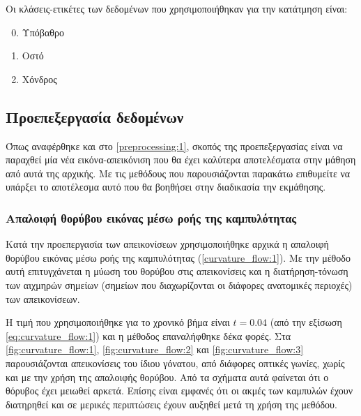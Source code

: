 \documentclass[a4paper,12pt]{article}
\begin{document}
Οι κλάσεις-ετικέτες των δεδομένων που χρησιμοποιήθηκαν για την κατάτμηση είναι:

\begin{enumerate}
    \setcounter{enumi}{-1} 
    \item Υπόβαθρο
    \item Οστό
    \item Χόνδρος
\end{enumerate}

\subsection{Προεπεξεργασία δεδομένων}

Όπως αναφέρθηκε και στο \ref{preprocessing:1}, σκοπός της προεπεξεργασίας είναι
να παραχθεί μία νέα εικόνα-απεικόνιση που θα έχει καλύτερα αποτελέσματα στην
μάθηση από αυτά της αρχικής. Με τις μεθόδους που παρουσιάζονται παρακάτω
επιθυμείτε να υπάρξει το αποτέλεσμα αυτό που θα βοηθήσει στην διαδικασία την
εκμάθησης.

\subsubsection{Απαλοιφή θορύβου εικόνας μέσω ροής της καμπυλότητας}

Κατά την προεπεργασία των απεικονίσεων χρησιμοποιήθηκε αρχικά η απαλοιφή θορύβου
εικόνας μέσω ροής της καμπυλότητας (\ref{curvature_flow:1}). Με την μέθοδο αυτή
επιτυγχάνεται η μύωση του θορύβου στις απεικονίσεις και η διατήρηση-τόνωση των
αιχμηρών σημείων (σημείων που διαχωρίζονται οι διάφορες ανατομικές περιοχές) των
απεικονίσεων.

Η τιμή που χρησιμοποιήθηκε για το χρονικό βήμα είναι $t=0.04$ (από την εξίσωση
\eqref{eq:curvature_flow:1}) και η μέθοδος επαναλήφθηκε δέκα φορές.  Στα
\autoref{fig:curvature_flow:1}, \autoref{fig:curvature_flow:2} και
\autoref{fig:curvature_flow:3} παρουσιάζονται απεικονίσεις του ίδιου γόνατου,
από διάφορες οπτικές γωνίες, χωρίς και με την χρήση της απαλοιφής θορύβου. Από
τα σχήματα αυτά φαίνεται ότι ο θόρυβος έχει μειωθεί αρκετά. Επίσης είναι εμφανές
ότι οι ακμές των καμπυλών έχουν διατηρηθεί και σε μερικές περιπτώσεις έχουν
αυξηθεί μετά τη χρήση της μεθόδου.
\end{document}
